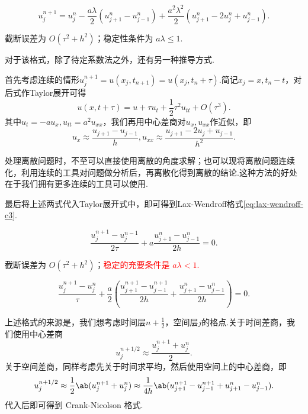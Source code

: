 \noindent{}
\begin{equation}\label{eq:lax-wendroff-c3}
    u_j^{n+1} = u_j^n - \frac{a\lambda}{2}(u_{j+1}^n - u_{j-1}^n) + \frac{a^2\lambda^2}{2}(u_{j+1}^n - 2u_j^n + u_{j-1}^n).
\end{equation}

截断误差为 $O(\tau^2 + h^2)$；稳定性条件为 $a\lambda \leq 1$.\par
对于该格式，除了待定系数法之外，还有另一种推导方式.\par
首先考虑连续的情形$u_j^{n+1}=u(x_j,t_{n+1})=u(x_j,t_n+\tau)$.简记$x_j=x,t_n-t$，对后式作Taylor展开可得
\begin{equation*}
    u(x,t+\tau)=u+\tau u_t+\frac{1}{2}\tau^2 u_{tt}+O(\tau^3). 
\end{equation*}
其中$u_t=-au_x,u_{tt}=a^2u_{xx}$，我们再用中心差商对$u_x,u_{xx}$作近似，即
\begin{equation*}
    u_x\approx \frac{u_{j+1}-u_{j-1}}{h},u_{xx}\approx \frac{u_{j+1}-2u_j+u_{j-1}}{h^2}.
\end{equation*}
\begin{note}
    处理离散问题时，不至可以直接使用离散的角度求解；也可以现将离散问题连续化，利用连续的工具对问题做分析后，再离散化得到离散的结论.这种方法的好处在于我们拥有更多连续的工具可以使用.
\end{note}

最后将上述两式代入Taylor展开式中，即可得到Lax-Wendroff格式\eqref{eq:lax-wendroff-c3}.

\noindent{}
\begin{equation}
    \frac{u_j^{n+1} - u_j^{n-1}}{2\tau} + a \frac{u_{j+1}^n - u_{j-1}^n}{2h} = 0.
\end{equation}

截断误差为 $O(\tau^2 + h^2)$；\textcolor{red}{稳定的充要条件是 $a\lambda < 1$.}

\noindent{}
\begin{equation}
    \frac{u_j^{n+1} - u_j^n}{\tau} + \frac{a}{2}\left( \frac{u_{j+1}^{n+1} - u_{j-1}^{n+1}}{2h} + \frac{u_{j+1}^n - u_{j-1}^n}{2h} \right) = 0.
\end{equation}

上述格式的来源是，我们想考虑时间层$n+\frac{1}{2}$，空间层$j$的格点.关于时间差商，我们使用中心差商
\begin{equation*}
    u^{n+1/2}_j\approx \frac{u_j^{n+1}+u_j^n}{2}.
\end{equation*}
关于空间差商，同样考虑先关于时间求平均，然后使用空间上的中心差商，即
\begin{equation*}
    u^{n+1/2}_{j}\approx \frac{1}{2}\ab(u^{n+1}_{j} + u^{n}_{j})\approx \frac{1}{4h}\ab(u^{n+1}_{j+1} - u^{n+1}_{j-1} + u^{n}_{j+1} - u^{n}_{j-1}).
\end{equation*}
代入后即可得到 Crank-Nicolson 格式.\par


